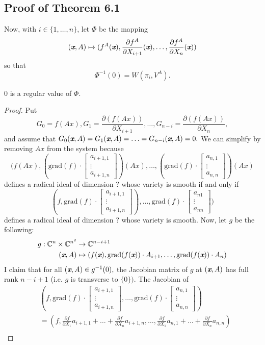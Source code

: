 \documentclass[sigconf]{acmart}
\def\xb{\textit{\textbf{x}}}
\def\C{\mathbb{C}}
\def\grad{\textrm{grad}}
\def\pa{\partial}
\def\bbm{\begin{bmatrix}}
\def\ebm{\end{bmatrix}}
\begin{document}
\subsection{Proof of Theorem 6.1}
Now, with $i \in \{1,\hdots,n\}$, let $\Phi$ be the mapping \[(\xb,A) \mapsto (f^A(\xb), \frac{\partial f^A}{\partial X_{i+1}}(\xb),\hdots,
\frac{\partial f^A}{\partial X_n}(\xb))\] so that 
\[
\Phi^{-1}(0)= W(\pi_i,V^A).
\]
%
\begin{proposition} 
0 is a regular value of $\Phi$.
\end{proposition}
%
\begin{proof}
Put
\[
G_0 = f(Ax), 
G_1 = \frac{\partial (f(Ax))}{\partial X_{i+1}},\hdots,G_{n-i} = \frac{\partial (f(Ax))}{\partial X_n},
\] 
and assume that $G_0(\xb,A)=G_1(\xb,A)=\hdots =G_{n-i}(\xb,A)=0.$ We can simplify by removing $Ax$ from the system because  
\[
(f(Ax),(\grad(f)\cdot 
\bbm 
a_{i+1,1} \\
\vdots \\
a_{i+1,n} 
\ebm)(Ax),\hdots, 
(\grad(f)\cdot 
\bbm 
a_{n,1} \\
\vdots \\
a_{n,n} 
\ebm)(Ax)
\] 
defines a radical ideal of dimension ? whose variety is smooth if and only if 
\[
(f,\grad(f)\cdot 
\bbm 
a_{i+1,1} \\
\vdots \\
a_{i+1,n} 
\ebm),\hdots, 
\grad(f)\cdot 
\bbm 
a_{n1} \\
\vdots \\
a_{nn} 
\ebm)
\]
defines a radical ideal of dimension ? whose variety is smooth. Now, let $g$ be the following:
%
\begin{align*}
    g: \C^n \times \C^{n^2} &\rightarrow \C^{n-i+1} \\
       (\xb,A) &\mapsto 
       \left(f(\xb),\grad(f(\xb))\cdot 
A_{i+1},\hdots, 
\grad(f(\xb))\cdot 
A_{n}
\right)
\end{align*}
%
I claim that for all $(\xb,A) \in g^{-1}(0),$ the Jacobian matrix of $g$ at $(\xb,A)$ has full rank $n-i+1$ (i.e. $g$ is transverse to $\{0\}).$ The Jacobian of 
%
\begin{align*}
       & \left(f,\grad(f)\cdot 
\bbm 
a_{i+1,1} \\
\vdots \\
a_{i+1,n} 
\ebm,\hdots, 
\grad(f)\cdot 
\bbm 
a_{n,1} \\
\vdots \\
a_{n,n} 
\ebm\right) \\
&= \left(f, \frac{\pa f}{\pa X_1} a_{i+1,1} + \hdots + \frac{\pa f}{\pa X_n}a_{i+1,n}, \hdots, \frac{\pa f}{\pa X_1} a_{n,1} + \hdots + \frac{\pa f}{\pa X_n}a_{n,n}\right) \\

\end{align*}
\end{proof}
\end{document}
